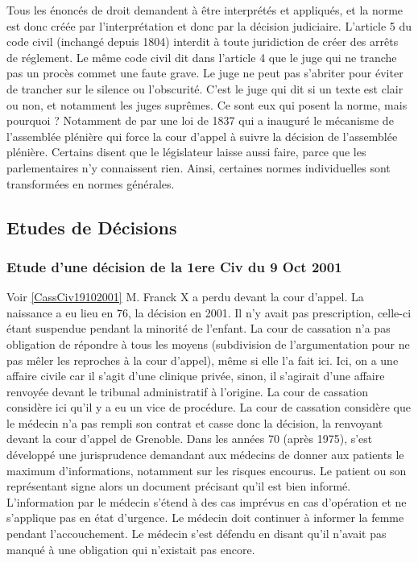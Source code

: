 \documentclass[math]{cours}
\begin{document}
	Tous les énoncés de droit demandent à être interprétés et appliqués, et la norme est donc créée par l'interprétation et donc par la décision judiciaire.
	L'article 5 du code civil (inchangé depuis 1804) interdit à toute juridiction de créer des arrêts de réglement.
	Le même code civil dit dans l'article 4 que le juge qui ne tranche pas un procès commet une faute grave.
	Le juge ne peut pas s'abriter pour éviter de trancher sur le silence ou l'obscurité.
	C'est le juge qui dit si un texte est clair ou non, et notamment les juges suprêmes. Ce sont eux qui posent la norme, mais pourquoi ?
	Notamment de par une loi de 1837 qui a inauguré le mécanisme de l'assemblée plénière qui force la cour d'appel à suivre la décision de l'assemblée plénière.
	Certains disent que le législateur laisse aussi faire, parce que les parlementaires n'y connaissent rien.
	Ainsi, certaines normes individuelles sont transformées en normes générales.

\subsection{Etudes de Décisions}
\subsubsection{Etude d'une décision de la 1ere Civ du 9 Oct 2001}
	Voir \ref{CassCiv19102001}
	M. Franck X a perdu devant la cour d'appel.
	La naissance a eu lieu en 76, la décision en 2001. Il n'y avait pas prescription, celle-ci étant suspendue pendant la minorité de l'enfant.
	La cour de cassation n'a pas obligation de répondre à tous les moyens (subdivision de l'argumentation pour ne pas mêler les reproches à la cour d'appel), même si elle l'a fait ici.
	Ici, on a une affaire civile car il s'agit d'une clinique privée, sinon, il s'agirait d'une affaire renvoyée devant le tribunal administratif à l'origine.
	La cour de cassation considère ici qu'il y a eu un vice de procédure.
	La cour de cassation considère que le médecin n'a pas rempli son contrat et casse donc la décision, la renvoyant devant la cour d'appel de Grenoble.
	Dans les années 70 (après 1975), s'est développé une jurisprudence demandant aux médecins de donner aux patients le maximum d'informations, notamment sur les risques encourus.
	Le patient ou son représentant signe alors un document précisant qu'il est bien informé.
	L'information par le médecin s'étend à des cas imprévus en cas d'opération et ne s'applique pas en état d'urgence.
	Le médecin doit continuer à informer la femme pendant l'accouchement.
	Le médecin s'est défendu en disant qu'il n'avait pas manqué à une obligation qui n'existait pas encore.\\
\end{document}
